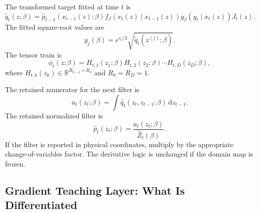 \documentclass[11pt]{article}
\numberwithin{equation}{section}
\newcommand{\R}{\mathbb R}
\newcommand{\dd}{\,\mathrm d}
\begin{document}
The transformed target fitted at time \(t\) is
\begin{equation}
    \widetilde q_t(z;\beta)
    =
    \widehat p_{t-1}(x_{t-1}(z);\beta)
    f_\beta(x_t(z)\mid x_{t-1}(z))
    g_\beta(y_t\mid x_t(z))
    J_t(z).
    \label{eq:p24-p19-46}
\end{equation}
The fitted square-root values are
\begin{equation}
    y_j(\beta)
    =
    e^{c_t/2}\sqrt{\widetilde q_t(z^{(j)};\beta)}.
    \label{eq:p24-p19-47}
\end{equation}
The tensor train is
\begin{equation}
    \phi_t(z;\beta)
    =
    H_{t,1}(z_1;\beta)H_{t,2}(z_2;\beta)\cdots H_{t,D}(z_D;\beta),
    \label{eq:p24-p19-48}
\end{equation}
where \(H_{t,k}(z_k)\in\R^{R_{k-1}\times R_k}\) and \(R_0=R_D=1\).

The retained numerator for the next filter is
\begin{equation}
    a_t(z_t;\beta)
    =
    \int \widehat q_t(z_t,z_{t-1};\beta)\dd z_{t-1}.
    \label{eq:p24-p19-49}
\end{equation}
The retained normalized filter is
\begin{equation}
    \widehat p_t(z_t;\beta)
    =
    \frac{a_t(z_t;\beta)}{\widehat Z_t(\beta)}.
    \label{eq:p24-p19-50}
\end{equation}
If the filter is reported in physical coordinates, multiply by the appropriate
change-of-variables factor.  The derivative logic is unchanged if the domain
map is frozen.

\subsection{Gradient Teaching Layer: What Is Differentiated}
\end{document}
